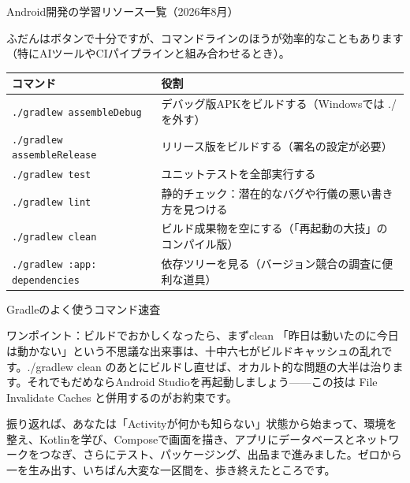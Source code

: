 \begin{center}\small\color{gray}Android開発の学習リソース一覧（2026年8月）\end{center}


ふだんはボタンで十分ですが、コマンドラインのほうが効率的なこともあります（特にAIツールやCIパイプラインと組み合わせるとき）。

\begin{center}
\begin{tabularx}{\linewidth}{|X|X|}
\hline
\textbf{コマンド} & \textbf{役割} \tabularnewline
\hline
\texttt{.\allowbreak /\allowbreak gradlew assembleDebug} & デバッグ版APKをビルドする（Windowsでは ./ を外す） \tabularnewline
\texttt{.\allowbreak /\allowbreak gradlew assembleRelease} & リリース版をビルドする（署名の設定が必要） \tabularnewline
\texttt{.\allowbreak /\allowbreak gradlew test} & ユニットテストを全部実行する \tabularnewline
\texttt{.\allowbreak /\allowbreak gradlew lint} & 静的チェック：潜在的なバグや行儀の悪い書き方を見つける \tabularnewline
\texttt{.\allowbreak /\allowbreak gradlew clean} & ビルド成果物を空にする（「再起動の大技」のコンパイル版） \tabularnewline
\texttt{.\allowbreak /\allowbreak gradlew :app: dependencies} & 依存ツリーを見る（バージョン競合の調査に便利な道具） \tabularnewline
\hline
\end{tabularx}
\end{center}

\begin{center}\small\color{gray}Gradleのよく使うコマンド速査\end{center}

\begin{tcbinfo}{ワンポイント：ビルドでおかしくなったら、まずclean}
「昨日は動いたのに今日は動かない」という不思議な出来事は、十中六七がビルドキャッシュの乱れです。./gradlew clean のあとにビルドし直せば、オカルト的な問題の大半は治ります。それでもだめならAndroid Studioを再起動しましょう——この技は File Invalidate Caches と併用するのがお約束です。

\end{tcbinfo}



振り返れば、あなたは「Activityが何かも知らない」状態から始まって、環境を整え、Kotlinを学び、Composeで画面を描き、アプリにデータベースとネットワークをつなぎ、さらにテスト、パッケージング、出品まで進みました。ゼロから一を生み出す、いちばん大変な一区間を、歩き終えたところです。

